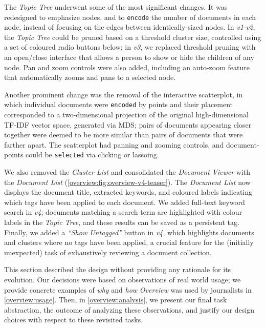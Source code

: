 The {\it Topic Tree} underwent some of the most significant changes. 
It was redesigned to emphasize nodes, and to {\tt encode} the number of documents in each node, instead of focusing on the edges between identically-sized nodes.
In {\it v1-v2}, the {\it Topic Tree} could be pruned based on a threshold cluster size, controlled using a set of coloured radio buttons below; in {\it v3}, we replaced threshold pruning with an open/close interface that allows a person to show or hide the children of any node.
Pan and zoom controls were also added, including an auto-zoom feature that automatically zooms and pans to a selected node.

Another prominent change was the removal of the interactive scatterplot, in which individual documents were {\tt encoded} by points and their placement corresponded to a two-dimensional projection of the original high-dimensional \ac{TF-IDF} vector space, generated via \ac{MDS}; pairs of documents appearing closer together were deemed to be more similar than pairs of documents that were farther apart. 
The scatterplot had panning and zooming controls, and document-points could be {\tt selected} via clicking or lassoing.

We also removed the {\it Cluster List} and consolidated the {\it Document Viewer} with the {\it Document List} (\cf \autoref{overview:fig:overview-v4-teaser}).
The {\it Document List} now displays the document title, extracted keywords, and coloured labels indicating which tags have been applied to each document.
We added full-text keyword search in {\it v4}; documents matching a search term are highlighted with colour labels in the {\it Topic Tree}, and these results can be saved as a persistent tag.
Finally, we added a {\it ``Show Untagged''} button in {\it v4}, which highlights documents and clusters where no tags have been applied, a crucial feature for the (initially unexpected) task of exhaustively reviewing a document collection.

This section described the design without providing any rationale for its evolution. 
Our decisions were based on observations of real world usage; we provide concrete examples of {\it why} and {\it how} {\it Overview} was used by journalists in \autoref{overview:usage}. 
Then, in \autoref{overview:analysis}, we present our final task abstraction, the outcome of analyzing these observations, and justify our design choices with respect to these revisited tasks. 

